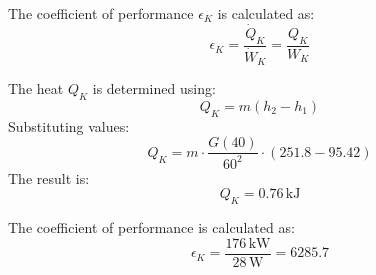 The coefficient of performance \( \epsilon_K \) is calculated as:  
\[
\epsilon_K = \frac{\dot{Q}_K}{\dot{W}_K} = \frac{Q_K}{W_K}
\]  

The heat \( Q_K \) is determined using:  
\[
Q_K = m(h_2 - h_1)
\]  
Substituting values:  
\[
Q_K = m \cdot \frac{G(40)}{60^2} \cdot (251.8 - 95.42)
\]  
The result is:  
\[
Q_K = 0.76 \, \text{kJ}
\]

The coefficient of performance is calculated as:  
\[
\epsilon_K = \frac{176 \, \text{kW}}{28 \, \text{W}} = 6285.7
\]